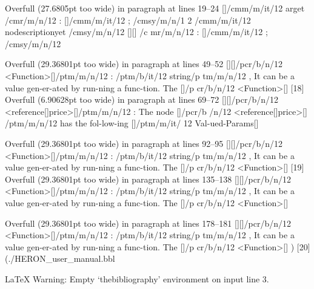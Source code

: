 Overfull \hbox (27.6805pt too wide) in paragraph at lines 19--24
[]\OML/cmm/m/it/12 arget /cmr/m/n/12 : []\OML/cmm/m/it/12 ; \OMS/cmsy/m/n/1
2 ^^@ ^^@ \OML/cmm/m/it/12 nodescriptionyet \OMS/cmsy/m/n/12 ^^@ ^^@[][] /c
mr/m/n/12 : []\OML/cmm/m/it/12 ; \OMS/cmsy/m/n/12 ^^@ ^^@

Overfull \hbox (29.36801pt too wide) in paragraph at lines 49--52
[][]/pcr/b/n/12 <Function>[]/ptm/m/n/12 : /ptm/b/it/12 string/p
tm/m/n/12 , It can be a value gen-er-ated by run-ning a func-tion. The []/p
cr/b/n/12 <Function>[]
[18]
Overfull \hbox (6.90628pt too wide) in paragraph at lines 69--72
[][]/pcr/b/n/12 <reference[]price>[]/ptm/m/n/12 : The node []/pcr/b
/n/12 <reference[]price>[] /ptm/m/n/12 has the fol-low-ing []/ptm/m/it/
12 Val-ued-Params[]

Overfull \hbox (29.36801pt too wide) in paragraph at lines 92--95
[][]/pcr/b/n/12 <Function>[]/ptm/m/n/12 : /ptm/b/it/12 string/p
tm/m/n/12 , It can be a value gen-er-ated by run-ning a func-tion. The []/p
cr/b/n/12 <Function>[]
[19]
Overfull \hbox (29.36801pt too wide) in paragraph at lines 135--138
[][]/pcr/b/n/12 <Function>[]/ptm/m/n/12 : /ptm/b/it/12 string/p
tm/m/n/12 , It can be a value gen-er-ated by run-ning a func-tion. The []/p
cr/b/n/12 <Function>[]

Overfull \hbox (29.36801pt too wide) in paragraph at lines 178--181
[][]/pcr/b/n/12 <Function>[]/ptm/m/n/12 : /ptm/b/it/12 string/p
tm/m/n/12 , It can be a value gen-er-ated by run-ning a func-tion. The []/p
cr/b/n/12 <Function>[]
) [20] (./HERON_user_manual.bbl

LaTeX Warning: Empty `thebibliography' environment on input line 3.

